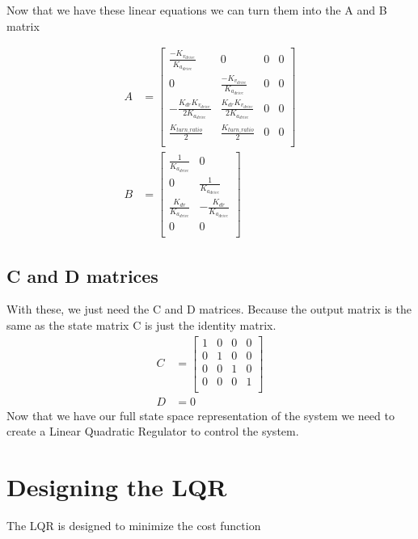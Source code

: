 \documentclass{scrartcl}
\begin{document}
Now that we have these linear equations we can turn them into the A and B matrix

\begin{align}
    A & =
    \begin{bmatrix}
        \frac{-K_{v_\mathit{drive}}}{K_{a_\mathit{drive}}}               & 0                                                               & 0 & 0 \\
        0                                                                & \frac{-K_{v_\mathit{drive}}}{K_{a_\mathit{drive}}}              & 0 & 0 \\
        -\frac{K_\mathit{dr}K_{v_\mathit{drive}}}{2K_{a_\mathit{drive}}} & \frac{K_\mathit{dr}K_{v_\mathit{drive}}}{2K_{a_\mathit{drive}}} & 0 & 0 \\
        \frac{K_\mathit{turn\_ratio}}{2}                                 & \frac{K_\mathit{turn\_ratio}}{2}                                & 0 & 0 \\
    \end{bmatrix} \\
    B & =
    \begin{bmatrix}
        \frac{1}{K_{a_\mathit{drive}}}             & 0                                           \\
        0                                          & \frac{1}{K_{a_\mathit{drive}}}              \\
        \frac{K_\mathit{dr}}{K_{a_\mathit{drive}}} & -\frac{K_\mathit{dr}}{K_{a_\mathit{drive}}} \\
        0                                          & 0                                           \\
    \end{bmatrix}
\end{align}

\subsection{C and D matrices}
With these, we just need the C and D matrices.
Because the output matrix is the same as the state matrix C is just the identity matrix.
\begin{align}
    C & =
    \begin{bmatrix}
        1 & 0 & 0 & 0 \\
        0 & 1 & 0 & 0 \\
        0 & 0 & 1 & 0 \\
        0 & 0 & 0 & 1 \\
    \end{bmatrix} \\
    D & = 0
\end{align}
Now that we have our full state space representation of the system we need to create a Linear Quadratic Regulator to control the system.

\section{Designing the LQR}
The LQR is designed to minimize the cost function
\end{document}
